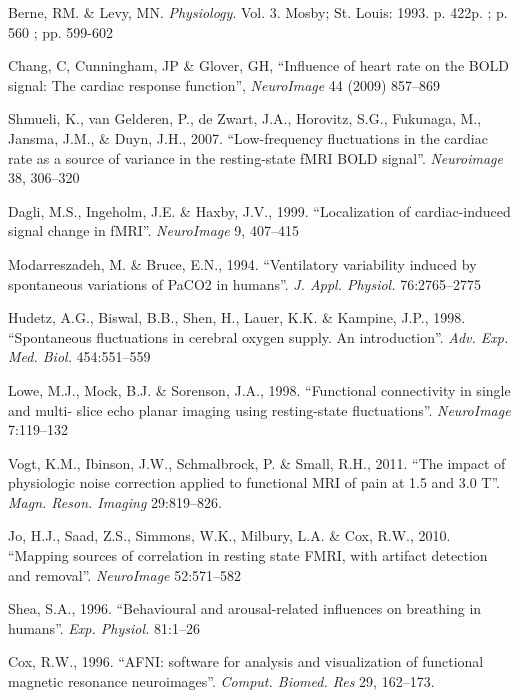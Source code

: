 \documentclass[twoside,twocolumn]{article}
\begin{document}
\begin{thebibliography}{99}
     Berne, RM. \& Levy, MN. {\em Physiology}. Vol. 3. Mosby; St. Louis: 1993. p. 422p. ; p. 560 ; pp. 599-602
    
     Chang, C, Cunningham, JP \& Glover, GH, ``Inﬂuence of heart rate on the BOLD signal: The cardiac response function'', {\em NeuroImage} 44 (2009) 857–869
    
     Shmueli, K., van Gelderen, P., de Zwart, J.A., Horovitz, S.G., Fukunaga, M., Jansma, J.M., \& Duyn, J.H., 2007. ``Low-frequency ﬂuctuations in the cardiac rate as a source of variance in the resting-state fMRI BOLD signal''. {\em Neuroimage} 38, 306–320
    
     Dagli, M.S., Ingeholm, J.E. \& Haxby, J.V., 1999. ``Localization of cardiac-induced signal change in fMRI''. {\em NeuroImage} 9, 407–415
    
     Modarreszadeh, M. \& Bruce, E.N., 1994. ``Ventilatory variability induced by spontaneous variations of PaCO2 in humans''. {\em J. Appl. Physiol.} 76:2765–2775
    
     Hudetz, A.G., Biswal, B.B., Shen, H., Lauer, K.K. \& Kampine, J.P., 1998. ``Spontaneous ﬂuctuations in cerebral oxygen supply. An introduction''. {\em Adv. Exp. Med. Biol.} 454:551–559
    
     Lowe, M.J., Mock, B.J. \& Sorenson, J.A., 1998. ``Functional connectivity in single and multi- slice echo planar imaging using resting-state ﬂuctuations''. {\em NeuroImage} 7:119–132
    
     Vogt, K.M., Ibinson, J.W., Schmalbrock, P. \& Small, R.H., 2011. ``The impact of physiologic noise correction applied to functional MRI of pain at 1.5 and 3.0 T''. {\em Magn. Reson. Imaging} 29:819–826.
    
     Jo, H.J., Saad, Z.S., Simmons, W.K., Milbury, L.A. \& Cox, R.W., 2010. ``Mapping sources of correlation in resting state FMRI, with artifact detection and removal''. {\em NeuroImage} 52:571–582
    
     Shea, S.A., 1996. ``Behavioural and arousal-related inﬂuences on breathing in humans''. {\em Exp. Physiol.} 81:1–26
    
     Cox, R.W., 1996. ``AFNI: software for analysis and visualization of functional magnetic resonance neuroimages''. {\em Comput. Biomed. Res} 29, 162–173.
    

\end{thebibliography}
\end{document}
